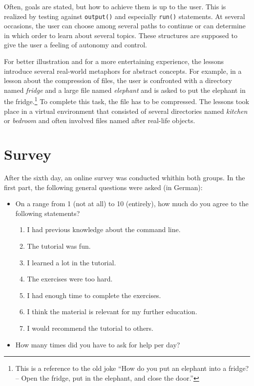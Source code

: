 \documentclass[paper=a4,abstract=on,cleardoublepage=empty,numbers=noenddot,toc=bib,12pt,appendixprefix=true]{scrreprt}
\begin{document}
Often, goals are stated, but how to achieve them is up to the user. This is realized by testing against \texttt{output()} and especially \texttt{run()} statements. At several occasions, the user can choose among several paths to continue or can determine in which order to learn about several topics. These structures are supposed to give the user a feeling of autonomy and control.

For better illustration and for a more entertaining experience, the lessons introduce several real-world metaphors for abstract concepts. For example, in a lesson about the compression of files, the user is confronted with a directory named \textit{fridge} and a large file named \textit{elephant} and is asked to put the elephant in the fridge.\footnote{This is a reference to the old joke “How do you put an elephant into a fridge? -- Open the fridge, put in the elephant, and close the door.”} To complete this task, the file has to be compressed. The lessons took place in a virtual environment that consisted of several directories named \emph{kitchen} or \emph{bedroom} and often involved files named after real-life objects.

\section{Survey}

After the sixth day, an online survey was conducted whithin both groups. In the first part, the following general questions were asked (in German):

\begin{itemize}
    \item On a range from 1 (not at all) to 10 (entirely), how much do you agree to the following statements?
        \begin{enumerate}
            \item I had previous knowledge about the command line.
            \item The tutorial was fun.
            \item I learned a lot in the tutorial.
            \item The exercises were too hard.
            \item I had enough time to complete the exercises.
            \item I think the material is relevant for my further education.
            \item I would recommend the tutorial to others.
        \end{enumerate}
    \item How many times did you have to ask for help per day?
\end{itemize}
\end{document}
